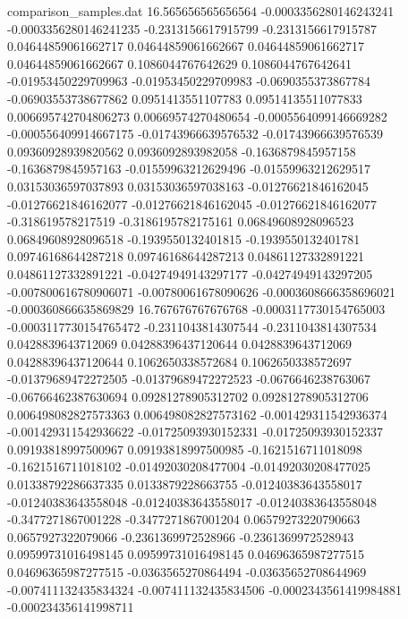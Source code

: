 \begin{filecontents}{comparison_samples.dat}
16.565656565656564  -0.0003356280146243241  -0.0003356280146241235  -0.2313156617915799    -0.2313156617915787    0.04644859061662717    0.04644859061662667    0.04644859061662717    0.04644859061662667    0.1086044767642629     0.1086044767642641     -0.01953450229709963    -0.01953450229709983    -0.0690355373867784    -0.06903553738677862   0.0951413551107783      0.09514135511077833     0.006695742704806273    0.00669574270480654     -0.0005564099146669282  -0.000556409914667175   -0.01743966639576532    -0.01743966639576539    0.09360928939820562     0.0936092893982058      -0.1636879845957158     -0.1636879845957163     -0.01559963212629496   -0.01559963212629517   0.03153036597037893    0.03153036597038163    -0.01276621846162045    -0.01276621846162077    -0.01276621846162045    -0.01276621846162077    -0.318619578217519     -0.3186195782175161    0.06849608928096523     0.06849608928096518     -0.1939550132401815    -0.1939550132401781    0.09746168644287218     0.09746168644287213     0.04861127332891221     0.04861127332891221     -0.04274949143297177   -0.04274949143297205   -0.007800616780906071  -0.00780061678090626   -0.0003608666358696021  -0.000360866635869829 
16.767676767676768  -0.0003117730154765003  -0.0003117730154765472  -0.2311043814307544    -0.2311043814307534    0.0428839643712069     0.04288396437120644    0.0428839643712069     0.04288396437120644    0.1062650338572684     0.1062650338572697     -0.01379689472272505    -0.01379689472272523    -0.0676646238763067    -0.06766462387630694   0.09281278905312702     0.09281278905312706     0.006498082827573363    0.006498082827573162    -0.001429311542936374   -0.001429311542936622   -0.01725093930152331    -0.01725093930152337    0.09193818997500967     0.09193818997500985     -0.1621516711018098     -0.1621516711018102     -0.01492030208477004   -0.01492030208477025   0.01338792286637335    0.0133879228663755     -0.01240383643558017    -0.01240383643558048    -0.01240383643558017    -0.01240383643558048    -0.3477271867001228    -0.3477271867001204    0.06579273220790663     0.0657927322079066      -0.2361369972528966    -0.2361369972528943    0.09599731016498145     0.09599731016498145     0.04696365987277515     0.04696365987277515     -0.0363565270864494    -0.03635652708644969   -0.007411132435834324  -0.007411132435834506  -0.0002343561419984881  -0.000234356141998711 

\end{filecontents}
